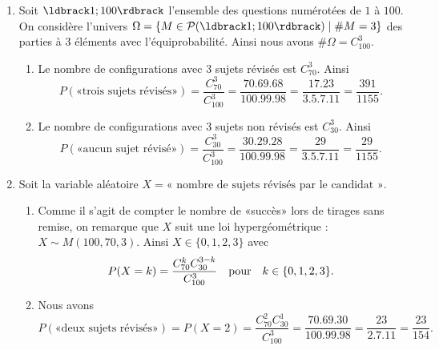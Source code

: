 \documentclass[12pt,reqno]{amsart}
\begin{document}
\begin{solution}
  \begin{enumerate}
    \item Soit $\iintv{1;100}$ l'ensemble des questions numérotées de $1$ à $100$. On considère l'univers $\Omega = \{M \in \mathcal{P}(\iintv{1;100}) \;|\; \#M=3\}$ des parties à $3$ éléments avec l'équiprobabilité. Ainsi nous avons $\#\Omega = C_{100}^{3}$.
    \begin{enumerate}
      \item Le nombre de configurations avec $3$ sujets révisés est $C_{70}^{3}$. Ainsi
      $$
        P(\text{«trois sujets révisés»}) = \frac{C_{70}^{3}}{C_{100}^{3}} = \frac{70.69.68}{100.99.98} = \frac{17.23}{3.5.7.11} = \frac{391}{1155}.
      $$
      \item Le nombre de configurations avec $3$ sujets non révisés est $C_{30}^{3}$. Ainsi
      $$
        P(\text{«aucun sujet révisé»}) = \frac{C_{30}^{3}}{C_{100}^{3}} = \frac{30.29.28}{100.99.98} = \frac{29}{3.5.7.11} = \frac{29}{1155}.
      $$
    \end{enumerate}
    \item Soit la variable aléatoire $X=\text{« nombre de sujets révisés par le candidat »}$.
    \begin{enumerate}
      \item Comme il s'agit de compter le nombre de «succès» lors de tirages sans remise, on remarque que $X$ suit une loi hypergéométrique : $X \sim M(100,70,3)$. Ainsi $X \in \{0,1,2,3\}$ avec
      $$
        P(X=k) = \frac{C_{70}^{k}C_{30}^{3-k}}{C_{100}^{3}}
          \text{\quad pour\quad}
            k \in \{0,1,2,3\}.
      $$
      \item Nous avons
      $$
        P(\text{«deux sujets révisés»}) = P(X=2) = \frac{C_{70}^{2}C_{30}^{1}}{C_{100}^{3}} = \frac{70.69.30}{100.99.98} = \frac{23}{2.7.11} = \frac{23}{154}.
      $$
    \end{enumerate}
  \end{enumerate}
\end{solution}

\end{document}

